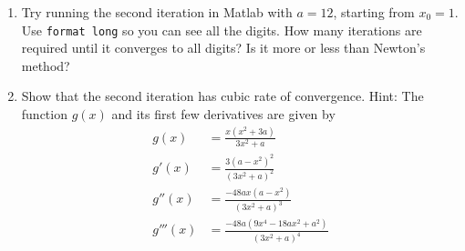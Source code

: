 \documentclass{article}
\begin{document}
\begin{enumerate}
\begin{enumerate}
\item Try running the second iteration in Matlab with $a=12$, starting from $x_0 = 1$. Use {\tt format long} so you can see all the digits. How many iterations are required until it converges to all digits? Is it more or less than Newton's method?

\item Show that the second iteration has cubic rate of convergence. Hint: The function $g(x)$ and its first few derivatives are given by
\begin{align*}
g(x) &=  \frac{x (x^2 + 3a)}{3x^2 + a}\\
g'(x) &= \frac{3(a-x^2)^2}{(3x^2+a)^2}\\
g''(x) &= \frac{-48ax(a-x^2)}{(3x^2+a)^3} \\
g'''(x) &= \frac{-48a(9x^4-18ax^2+a^2)}{(3x^2+a)^4}
\end{align*}

\end{enumerate}

\end{enumerate}
\end{document}
